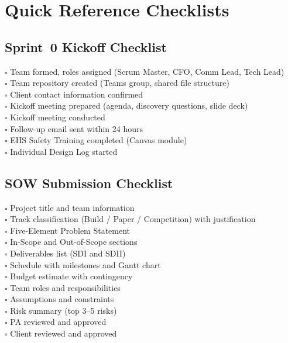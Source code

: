 \chapter{Quick Reference Checklists}

\section*{Sprint~0 Kickoff Checklist}
$\square$ Team formed, roles assigned (Scrum Master, CFO, Comm Lead, Tech Lead) \\
$\square$ Team repository created (Teams group, shared file structure) \\
$\square$ Client contact information confirmed \\
$\square$ Kickoff meeting prepared (agenda, discovery questions, slide deck) \\
$\square$ Kickoff meeting conducted \\
$\square$ Follow-up email sent within 24 hours \\
$\square$ EHS Safety Training completed (Canvas module) \\
$\square$ Individual Design Log started

\section*{SOW Submission Checklist}
$\square$ Project title and team information \\
$\square$ Track classification (Build / Paper / Competition) with justification \\
$\square$ Five-Element Problem Statement \\
$\square$ In-Scope and Out-of-Scope sections \\
$\square$ Deliverables list (SDI and SDII) \\
$\square$ Schedule with milestones and Gantt chart \\
$\square$ Budget estimate with contingency \\
$\square$ Team roles and responsibilities \\
$\square$ Assumptions and constraints \\
$\square$ Risk summary (top 3--5 risks) \\
$\square$ PA reviewed and approved \\
$\square$ Client reviewed and approved


